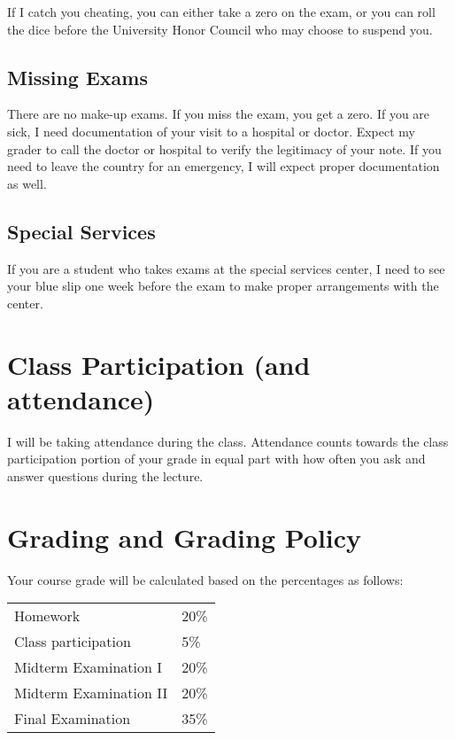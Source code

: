 \documentclass[12pt]{article}
\begin{document}
If I catch you cheating, you can either take a zero on the exam, or you can roll the dice before the University Honor Council who may choose to suspend you.


\subsection*{Missing Exams}

There are no make-up exams. If you miss the exam, you get a zero. If you are sick, I need documentation of your visit to a hospital or doctor. Expect my grader to call the doctor or hospital to verify the legitimacy of your note. If you need to leave the country for an emergency, I will expect proper documentation as well.

\subsection*{Special Services}

If you are a student who takes exams at the special services center, I need to see your blue slip one week before the exam to make proper arrangements with the center.

\section*{Class Participation (and attendance)}

I will be taking attendance during the class. Attendance counts towards the class participation portion of your grade in equal part with how often you ask and answer questions during the lecture.


\section*{Grading and Grading Policy}\label{sec:grading}

Your course grade will be calculated based on the percentages as follows: 

\begin{table}[h]
\centering
\begin{tabular}{l|l}
Homework & 20\% \\
Class participation & 5\% \\
Midterm Examination I & 20\%\\
Midterm Examination II & 20\%\\
Final Examination & 35\%
\end{tabular}
\end{table}
\FloatBarrier
\end{document}
